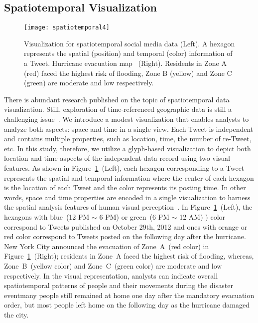 \subsection{Spatiotemporal Visualization}
\label{sec:spatiotemporal_visualization}

\begin{figure}[tb]
\centering
\texttt{[image: spatiotemporal4]}
\caption{Visualization for spatiotemporal social media data (Left).
A hexagon represents the spatial (position) and temporal (color) information of a Tweet.
Hurricane evacuation map~\cite{NYC:2012:HEM} (Right). Residents in Zone A (red) faced the highest risk of flooding, Zone B (yellow) and Zone C (green) are moderate and low respectively.}
\label{fig:spatiotemporal}
\end{figure}


There is abundant research published on the topic of spatiotemporal data visualization.
Still, exploration of time-referenced geographic data is still a challenging issue~\cite{Andrienko:2003:ESV}.
We introduce a modest visualization that enables analysts to analyze both aspects: space and time in a single view.
Each Tweet is independent and contains multiple properties, such as location, time, the number of re-Tweet, etc.
In this study, therefore, we utilize a glyph-based visualization to depict both location and time aspects of the independent data record using two visual features.
As shown in Figure~\ref{fig:spatiotemporal}~(Left), each hexagon corresponding to a Tweet represents the spatial and temporal information where the center of each hexagon is the location of each Tweet and the color represents its posting time.
In other words, space and time properties are encoded in a single visualization to harness the spatial analysis features of human visual perception~\cite{Treisman:1980:FIT}.
In Figure~\ref{fig:spatiotemporal}~(Left), the hexagons with blue~(12 PM $\sim$ 6 PM) or green~(6 PM $\sim$ 12 AM) ) color correspond to Tweets published on October 29th, 2012 and ones with orange or red color correspond to Tweets posted on the following day after the hurricane.
New York City announced the evacuation of Zone~A~(red color) in Figure~\ref{fig:spatiotemporal}~(Right); residents in Zone~A faced the highest risk of flooding, whereas, Zone~B~(yellow color) and Zone~C~(green color) are moderate and low respectively.
In the visual representation, analysts can indicate overall spatiotemporal patterns of people and their movements during the disaster event\textemdash many people still remained at home one day after the mandatory evacuation order, but most people left home on the following day as the hurricane damaged the city.